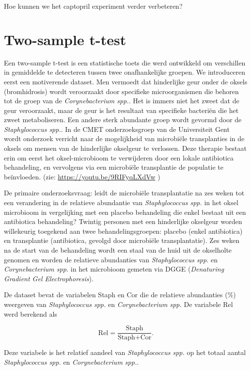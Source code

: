 \documentclass[
  12pt,dutch]{book}
\theoremstyle{definition}
\theoremstyle{definition}
\theoremstyle{definition}
\theoremstyle{definition}
\theoremstyle{remark}
\begin{document}
Hoe kunnen we het captopril experiment verder verbeteren?

\section{Two-sample t-test}\label{two-sample-t-test}

Een two-sample t-test is een statistische toets die werd ontwikkeld om verschillen in gemiddelde te detecteren tussen twee onafhankelijke groepen. We introduceren eerst een motiverende dataset.
Men vermoedt dat hinderlijke geur onder de oksels (bromhidrosis) wordt veroorzaakt door specifieke microorganismen die behoren tot de groep van de \emph{Corynebacterium spp.}. Het is immers niet het zweet dat de geur veroorzaakt, maar de geur is het resultaat van specifieke bacteriën die het zweet metaboliseren. Een andere sterk abundante groep wordt gevormd door de \emph{Staphylococcus spp.}. In de CMET onderzoeksgroep van de Universiteit Gent wordt onderzoek verricht naar de mogelijkheid van microbiële transplanties in de oksels om mensen van de hinderlijke okselgeur te verlossen. Deze therapie bestaat erin om eerst het oksel-microbioom te verwijderen door een lokale antibiotica behandeling, en vervolgens via een microbiële transplantie de populatie te beïnvloeden. (zie: \url{https://youtu.be/9RIFyqLXdVw} )

De primaire onderzoeksvraag: leidt de microbiële transplantatie na zes weken tot een verandering in de relatieve abundantie van \emph{Staphylococcus spp.} in het oksel microbioom in vergelijking met een placebo behandeling die enkel bestaat uit een antibiotica behandeling?
Twintig personen met een hinderlijke okselgeur worden willekeurig toegekend aan twee behandelingsgroepen: placebo (enkel antibiotica) en transplantie (antibiotica, gevolgd door microbiële transplantatie).
Zes weken na de start van de behandeling wordt een staal van de huid uit de okselholte genomen en worden de relatieve abundanties van \emph{Staphylococcus spp.} en \emph{Corynebacterium spp.} in het microbioom gemeten via DGGE (\emph{Denaturing Gradient Gel Electrophoresis}).

De dataset bevat de variabelen Staph en Cor die de relatieve abundanties (\%) weergeven van \emph{Staphylococcus spp.} en \emph{Corynebacterium spp.} De variabele Rel werd berekend als

\[
    \text{Rel}=\frac{\text{Staph}}{\text{Staph}+\text{Cor}}.
  \]

Deze variabele is het relatief aandeel van \emph{Staphylococcus spp.} op het totaal aantal \emph{Staphylococcus spp.} en \emph{Corynebacterium spp.}.
\end{document}
